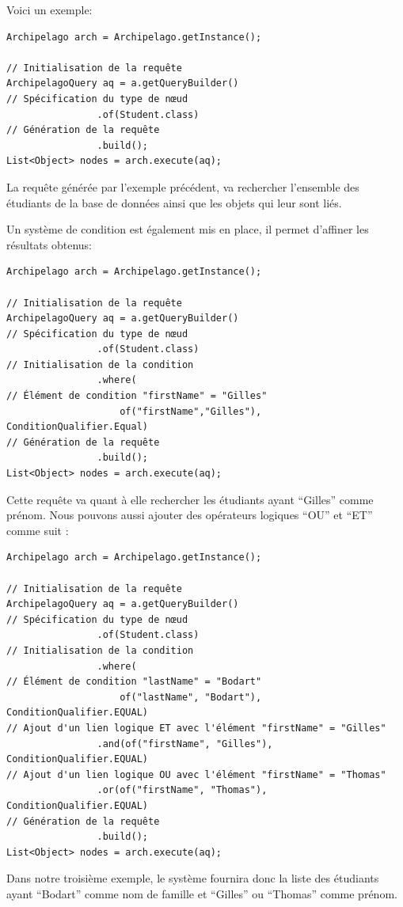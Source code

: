 \documentclass[a4paper,fleqn,12pt,oneside]{report}
\begin{document}
Voici un exemple:

\begin{lstlisting}
Archipelago arch = Archipelago.getInstance();

// Initialisation de la requête
ArchipelagoQuery aq = a.getQueryBuilder()
// Spécification du type de nœud
                .of(Student.class)
// Génération de la requête
                .build();
List<Object> nodes = arch.execute(aq);
\end{lstlisting}

La requête générée par l'exemple précédent, va rechercher l'ensemble des étudiants de la base de données ainsi que les objets qui leur sont liés.

Un système de condition est également mis en place, il permet d'affiner les résultats obtenus: 

\begin{lstlisting}
Archipelago arch = Archipelago.getInstance();

// Initialisation de la requête
ArchipelagoQuery aq = a.getQueryBuilder()
// Spécification du type de nœud
                .of(Student.class)
// Initialisation de la condition
                .where(
// Élément de condition "firstName" = "Gilles"
                	of("firstName","Gilles"), ConditionQualifier.Equal)
// Génération de la requête
                .build();
List<Object> nodes = arch.execute(aq);
\end{lstlisting}

Cette requête va quant à elle rechercher les étudiants ayant \enquote{Gilles} comme prénom.
\newpage
Nous pouvons aussi ajouter des opérateurs logiques \enquote{OU} et \enquote{ET} comme suit :
\begin{lstlisting}
Archipelago arch = Archipelago.getInstance();

// Initialisation de la requête
ArchipelagoQuery aq = a.getQueryBuilder()
// Spécification du type de nœud
                .of(Student.class)
// Initialisation de la condition
                .where(
// Élément de condition "lastName" = "Bodart"
                	of("lastName", "Bodart"), ConditionQualifier.EQUAL)
// Ajout d'un lien logique ET avec l'élément "firstName" = "Gilles"
                .and(of("firstName", "Gilles"), ConditionQualifier.EQUAL)
// Ajout d'un lien logique OU avec l'élément "firstName" = "Thomas"
                .or(of("firstName", "Thomas"), ConditionQualifier.EQUAL)
// Génération de la requête
                .build();
List<Object> nodes = arch.execute(aq);
\end{lstlisting}
Dans notre troisième exemple, le système fournira donc la liste des étudiants ayant \enquote{Bodart} comme nom de famille et \enquote{Gilles} ou \enquote{Thomas} comme prénom. 
\end{document}

